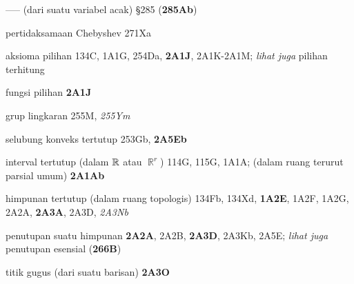 ----- (dari suatu variabel acak) \S285 ({\bf 285Ab})






 pertidaksamaan Chebyshev 271Xa


 aksioma pilihan 134C, 1A1G, 254Da, {\bf 2A1J}, 2A1K-2A1M; {\it lihat juga} pilihan terhitung

fungsi pilihan {\bf 2A1J}















 grup lingkaran 255M, {\it 255Ym}









selubung konveks tertutup 253Gb, {\bf 2A5Eb}




interval tertutup (dalam $\Bbb R$ atau $\BbbR^r$) 114G, 115G, 1A1A; (dalam ruang terurut parsial umum) {\bf 2A1Ab}
  

himpunan tertutup (dalam ruang topologis) 134Fb, 134Xd, {\bf 1A2E}, 1A2F, 1A2G, 2A2A, {\bf 2A3A}, 2A3D, {\it 2A3Nb}
  





 penutupan suatu himpunan {\bf 2A2A}, 2A2B, {\bf 2A3D}, 2A3Kb, 2A5E; {\it lihat juga} penutupan esensial ({\bf 266B})




 titik gugus (dari suatu barisan) {\bf 2A3O}






